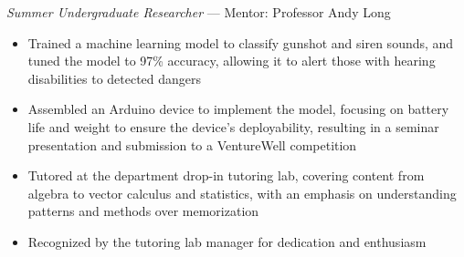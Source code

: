 \documentclass{resume}
\begin{document}
\textit{Summer Undergraduate Researcher} --- Mentor: Professor Andy Long
\begin{itemize}
  \item Trained a machine learning model to classify gunshot and siren sounds, and tuned the model to 97\% accuracy, allowing it to alert those with hearing disabilities to detected dangers
  \item Assembled an Arduino device to implement the model, focusing on battery life and weight to ensure the device's deployability, resulting in a seminar presentation and submission to a VentureWell competition

\end{itemize}

\begin{itemize}
\item Tutored at the department drop-in tutoring lab, covering content from algebra to vector calculus and statistics, with an emphasis on understanding patterns and methods over memorization
\item Recognized by the tutoring lab manager for dedication and enthusiasm
\end{itemize}
\end{document}
